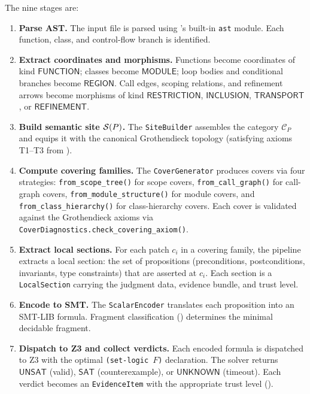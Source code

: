 The nine stages are:

\begin{enumerate}[label=\textbf{Stage \arabic*.},leftmargin=*]
  \item \textbf{Parse \Python{} AST.}
    The input file is parsed using \Python's built-in \texttt{ast}
    module.  Each function, class, and control-flow branch is
    identified.

  \item \textbf{Extract coordinates and morphisms.}
    Functions become coordinates of kind $\mathsf{FUNCTION}$; classes
    become $\mathsf{MODULE}$; loop bodies and conditional branches
    become $\mathsf{REGION}$.  Call edges, scoping relations, and
    refinement arrows become morphisms of kind $\mathsf{RESTRICTION}$,
    $\mathsf{INCLUSION}$, $\mathsf{TRANSPORT}$, or
    $\mathsf{REFINEMENT}$.

  \item \textbf{Build semantic site $\mathcal{S}(P)$.}
    The \texttt{SiteBuilder} assembles the category
    $\mathcal{C}_P$ and equips it with the canonical Grothendieck
    topology (satisfying axioms T1--T3 from ).

  \item \textbf{Compute covering families.}
    The \texttt{CoverGenerator} produces covers via four strategies:
    \texttt{from\_scope\_tree()} for scope covers,
    \texttt{from\_call\_graph()} for call-graph covers,
    \texttt{from\_module\_structure()} for module covers, and
    \texttt{from\_class\_hierarchy()} for class-hierarchy covers.
    Each cover is validated against the Grothendieck axioms via
    \texttt{CoverDiagnostics.check\_covering\_axiom()}.

  \item \textbf{Extract local sections.}
    For each patch $c_i$ in a covering family, the pipeline
    extracts a local section: the set of propositions (preconditions,
    postconditions, invariants, type constraints) that are asserted at
    $c_i$.  Each section is a \texttt{LocalSection} carrying
    the judgment data, evidence bundle, and trust level.

  \item \textbf{Encode to SMT.}
    The \texttt{ScalarEncoder} translates each proposition into an
    SMT-LIB formula.  Fragment classification ()
    determines the minimal decidable fragment.

  \item \textbf{Dispatch to Z3 and collect verdicts.}
    Each encoded formula is dispatched to Z3 with the optimal
    \texttt{(set-logic $F$)} declaration.  The solver returns
    $\mathsf{UNSAT}$ (valid), $\mathsf{SAT}$ (counterexample), or
    $\mathsf{UNKNOWN}$ (timeout).  Each verdict becomes an
    \texttt{EvidenceItem} with the appropriate trust level
    ().


\end{enumerate}
